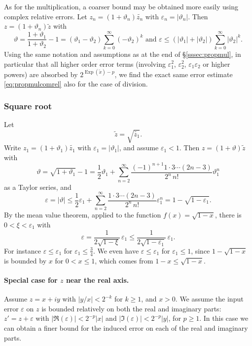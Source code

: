 \documentclass [11pt]{article}
\newcommand {\corr}[1]{{#1}}
\newcommand {\appro}[1]{\widetilde {#1}}
\DeclareMathOperator{\Exp}{\operatorname {Exp}}
\renewcommand {\epsilon}{\varepsilon}
\renewcommand {\theta}{\vartheta}
\renewcommand {\leq}{\leqslant}
\begin{document}
As for the multiplication, a coarser
bound may be obtained more easily using complex relative errors.
Let $\corr {z_n} = (1 + \theta_n) \appro {z_n}$ with
$\epsilon_n = | \theta_n |$. Then $\corr z = (1 + \theta_n) \appro z$
with
\[
\theta = \frac {1 + \theta_1}{1 + \theta_2} - 1
= (\theta_1 - \theta_2) \sum_{k = 0}^\infty (- \theta_2)^k
\text { and }
\epsilon \leq (|\theta_1| + |\theta_2|) \sum_{k = 0}^\infty |\theta_2|^k.
\]
Using the same notation and assumptions as at the end of
\S\ref {sssec:propmul}, in particular that all higher order error terms
(involving $\epsilon_1^2$, $\epsilon_2^2$, $\epsilon_1 \epsilon_2$
or higher powers) are absorbed by $2^{\Exp (\appro x) - p}$,
we find the exact same error estimate \eqref {eq:propmulcomrel}
also for the case of division.


\subsubsection {Square root}
Let
\[
\appro z = \sqrt {\appro {z_1}}.
\]
Write $\corr {z_1} = (1 + \theta_1) \appro {z_1}$ with
$\epsilon_1 = |\theta_1|$, and assume $\epsilon_1 < 1$.
Then $\corr z = (1 + \theta) \appro z$ with
\[
\theta = \sqrt {1 + \theta_1} - 1
= \frac {1}{2} \theta_1
+ \sum_{n=2}^\infty \frac {(-1)^{n+1} 1 \cdot 3 \cdots (2 n - 3)}{2^n \, n!}
   \theta_1^n
\]
as a Taylor series, and
\[
\epsilon = |\theta|
\leq
\frac {1}{2}  \epsilon_1
+ \sum_{n=2}^\infty \frac {1 \cdot 3 \cdots (2 n - 3)}{2^n \, n!}
\epsilon_1^n
= 1 - \sqrt {1 - \epsilon_1}.
\]
By the mean value theorem, applied to the function $f (x) = \sqrt {1 - x}$,
there is $0 < \xi < \epsilon_1$ with
\begin {equation}
\label {eq:propsqrt}
\epsilon = \frac {1}{2 \sqrt {1 - \xi}} \, \epsilon_1
\leq \frac {1}{2 \sqrt {1 - \epsilon_1}} \, \epsilon_1.
\end {equation}
For instance $\epsilon \leq \epsilon_1$ for $\epsilon_1 \leq \frac {3}{4}$.
We even have $\epsilon \leq \epsilon_1$ for $\epsilon_1 \leq 1$,
since $1 - \sqrt{1-x}$ is bounded by $x$
for $0 < x \leq 1$, which comes from $1 - x \leq \sqrt{1-x}$.

\paragraph{Special case for $z$ near the real axis.}
Assume $z = x + iy$ with $|y/x| < 2^{-k}$ for $k \ge 1$, and $x > 0$.
We assume the input error $\epsilon$ on $z$ is bounded relatively
on both the real and imaginary parts:
$z' = z + \epsilon$ with $|\Re(\epsilon)| < 2^{-p} |x|$ and
$|\Im(\epsilon)| < 2^{-p} |y|$, for $p \ge 1$.
In this case we can obtain a finer bound for the induced error
on each of the real and imaginary parts.
\end{document}
